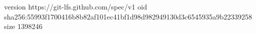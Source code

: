 version https://git-lfs.github.com/spec/v1
oid sha256:55993f1700416b8b82af101ec41bf1d98d982949130d3c6545935a9b22339258
size 1398246
